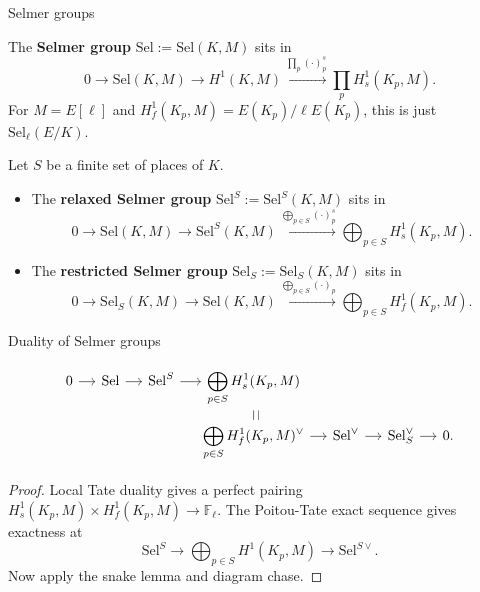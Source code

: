 \documentclass[10pt]{beamer}
\begin{document}
\begin{frame}[t]{Selmer groups}

The \textbf{Selmer group} $ \mathrm{Sel} := \mathrm{Sel}(K, M) $ sits in
$$ 0 \to \mathrm{Sel}(K, M) \to H^1(K, M) \xrightarrow{\prod_p (\cdot)_p^s} \prod_p H_s^1(K_p, M). $$
For $ M = E[\ell] $ and $ H_f^1(K_p, M) = E(K_p) / \ell E(K_p) $, this is just $ \mathrm{Sel}_\ell(E / K) $.

\vspace{0.5cm} Let $ S $ be a finite set of places of $ K $.
\begin{itemize}
\item The \textbf{relaxed Selmer group} $ \mathrm{Sel}^S := \mathrm{Sel}^S(K, M) $ sits in
$$ 0 \to \mathrm{Sel}(K, M) \to \mathrm{Sel}^S(K, M) \xrightarrow{\bigoplus_{p \in S} (\cdot)_p^s} \bigoplus_{p \in S} H_s^1(K_p, M). $$
\item The \textbf{restricted Selmer group} $ \mathrm{Sel}_S := \mathrm{Sel}_S(K, M) $ sits in
$$ 0 \to \mathrm{Sel}_S(K, M) \to \mathrm{Sel}(K, M) \xrightarrow{\bigoplus_{p \in S} (\cdot)_p} \bigoplus_{p \in S} H_f^1(K_p, M). $$
\end{itemize}

\end{frame}

\begin{frame}[t]{Duality of Selmer groups}

\begin{corollary}
\vspace{-0.5cm}
$$
\begin{tikzcd}[ampersand replacement=\&, column sep=small, row sep=0.1in]
0 \arrow{r} \& \mathrm{Sel} \arrow{r} \& \mathrm{Sel}^S \arrow{r} \& \displaystyle\bigoplus_{p \in S} H_s^1(K_p, M) \arrow[dash]{d}{\mid} \& \& \& \\
\& \& \& \displaystyle\bigoplus_{p \in S} H_f^1(K_p, M)^\vee \arrow{r} \& \mathrm{Sel}^\vee \arrow{r} \& \mathrm{Sel}_S^\vee \arrow{r} \& 0.
\end{tikzcd}
$$
\vspace{-0.5cm}
\end{corollary}

\begin{proof}
Local Tate duality gives a perfect pairing $ H_s^1(K_p, M) \times H_f^1(K_p, M) \to \mathbb{F}_\ell $. The Poitou-Tate exact sequence gives exactness at
$$ \mathrm{Sel}^S \to \bigoplus_{p \in S} H^1(K_p, M) \to \mathrm{Sel}^{S\vee}. $$
Now apply the snake lemma and diagram chase.
\end{proof}

\end{frame}
\end{document}
